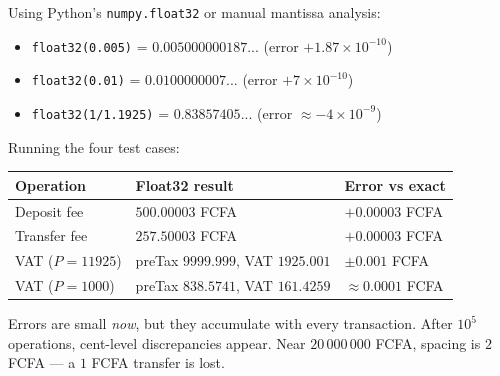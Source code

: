 \documentclass[11pt]{article}
\begin{document}
\begin{exemplebox}
Using Python's \texttt{numpy.float32} or manual mantissa analysis:
\begin{itemize}
\item \texttt{float32(0.005)} = $0.005000000187...$ (error $+1.87\times10^{-10}$)
\item \texttt{float32(0.01)} = $0.0100000007...$ (error $+7\times10^{-10}$)
\item \texttt{float32(1/1.1925)} = $0.83857405...$ (error $\approx -4\times10^{-9}$)
\end{itemize}
Running the four test cases:
\begin{center}
\begin{tabularx}{\linewidth}{|l|X|X|}\hline
\rowcolor{popblueL} \textbf{Operation} & \textbf{Float32 result} & \textbf{Error vs exact} \\ \hline
Deposit fee & $500.00003$ FCFA & $+0.00003$ FCFA \\ \hline
Transfer fee & $257.50003$ FCFA & $+0.00003$ FCFA \\ \hline
VAT ($P=11925$) & preTax $9999.999$, VAT $1925.001$ & $\pm 0.001$ FCFA \\ \hline
VAT ($P=1000$) & preTax $838.5741$, VAT $161.4259$ & $\approx 0.0001$ FCFA \\ \hline
\end{tabularx}
\end{center}
Errors are small \emph{now}, but they accumulate with every transaction. After $10^5$ operations, cent-level discrepancies appear. Near $20\,000\,000$ FCFA, spacing is $2$ FCFA — a $1$ FCFA transfer is lost.
\end{exemplebox}
\end{document}
